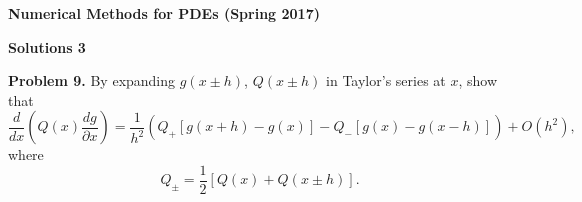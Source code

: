 \documentclass[10pt]{article}
\def\pr{{\partial}}
\begin{document}
\begin{center}
{{\bf Numerical Methods for PDEs (Spring 2017)}}
\end{center}


\begin{center}
{\large{\bf Solutions 3}}
\end{center}


\centerline{}






\noindent

\vskip 0.5cm
\noindent
{\bf Problem 9.} By  expanding $g(x\pm
h)$, $Q(x\pm h)$ in Taylor's series at $x$, show that
\[
\frac{d }{d x}\left(Q(x) \frac{d g}{\pr x}\right)=\frac{1}{h^2}
\left(Q_{+}\left[g(x+h)-g(x)\right]-
Q_{-}\left[g(x)-g(x-h)\right]\right) +O(h^2),
\]
where
\[
Q_{\pm}=\frac{1}{2}\left[Q(x)+Q(x\pm h)\right].
\]
\end{document}
